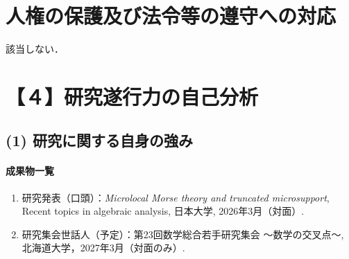 \documentclass[11pt,a4paper,uplatex,dvipdfmx]{ujarticle} 		%
\newcommand{\研究課題名}{打切り超局所台を用いた層のフーリエ変換の研究とシンプレクティック幾何への応用}
\newcommand{\研究機関名}{北海道大学}
\newcommand{\研究代表者氏名}{大柴寿浩}
\begin{document}

\section{人権の保護及び法令等の遵守への対応}

該当しない．




\section{【４】研究遂行力の自己分析}

\vspace{-26pt}
\subsection*{(1) 研究に関する自身の強み}
\paragraph{成果物一覧}
\begin{enumerate}[1]
	\item 研究発表（口頭）：\textit{Microlocal Morse theory and truncated microsupport}, Recent topics in algebraic analysis, 日本大学, 2026年3月（対面）.
	\item 研究集会世話人（予定）：第23回数学総合若手研究集会 〜数学の交叉点〜, 北海道大学，2027年3月（対面のみ）.
\end{enumerate}
\end{document}
